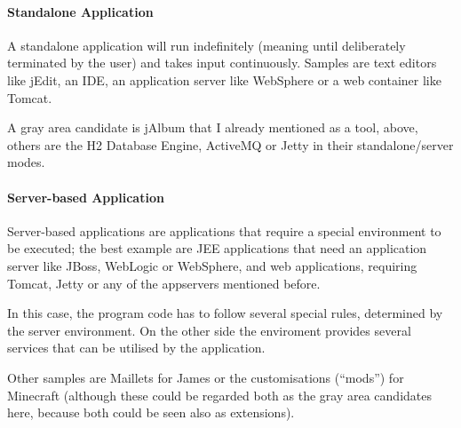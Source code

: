 \documentclass[11pt,a4paper, titlepage, parskip=half, headsepline, footsepline, cleardoublepage=current, headheight=1cm]{scrbook}
\begin{document}

\paragraph{Standalone Application}\label{sec:StandaloneApplication}
A standalone application will run indefinitely (meaning until deliberately terminated by the user) and takes input continuously. Samples are text editors like jEdit\autocite{JEDIT}, an IDE, an application server like WebSphere\autocite{IBM_WEBSPHERE} or a web container like Tomcat\autocite{APACHE_TOMCAT}.

A gray area candidate is jAlbum that I already mentioned as a tool, above, others are the H2 Database Engine, ActiveMQ or Jetty in their standalone/server modes.


\paragraph{Server-based Application}\label{sec:ServerbasedApplication}
Server-based applications are applications that require a special environment to be executed; the best example are JEE applications that need an application server like JBoss\autocite{REDHAT_JBOSS}, WebLogic\autocite{ORACLE_WEBLOGIC} or WebSphere\autocite{IBM_WEBSPHERE}, and web applications, requiring Tomcat\autocite{APACHE_TOMCAT}, Jetty\autocite{ECLIPSE_JETTY} or any of the appservers mentioned before.

In this case, the program code has to follow several special rules, determined by the server environment. On the other side the enviroment provides several services that can be utilised by the application.

Other samples are Maillets for James\autocite{APACHE_JAMES} or the customisations (“mods”) for Minecraft\autocite{MINECRAFT} (although these could be regarded both as the gray area candidates here, because both could be seen also as extensions).
\end{document}
